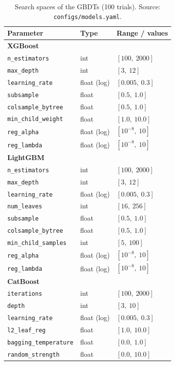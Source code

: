 \begin{table}[htbp]
\centering\footnotesize
\caption[Search spaces --- GBDTs]{Search spaces of the GBDTs (100
trials). Source: \texttt{configs/\allowbreak models.\allowbreak yaml}.}
\label{tab:app-busca-gbdt}
\begin{tabular}{lll}
\toprule
Parameter & Type & Range / values \\
\midrule
\multicolumn{3}{l}{\textbf{XGBoost}} \\
\texttt{n\_estimators}      & int   & $[100,\ 2000]$ \\
\texttt{max\_depth}         & int   & $[3,\ 12]$ \\
\texttt{learning\_rate}     & float (log) & $[0.005,\ 0.3]$ \\
\texttt{subsample}          & float & $[0.5,\ 1.0]$ \\
\texttt{colsample\_\allowbreak bytree}  & float & $[0.5,\ 1.0]$ \\
\texttt{min\_\allowbreak child\_\allowbreak weight} & float & $[1.0,\ 10.0]$ \\
\texttt{reg\_alpha}         & float (log) & $[10^{-8},\ 10]$ \\
\texttt{reg\_lambda}        & float (log) & $[10^{-8},\ 10]$ \\
\midrule
\multicolumn{3}{l}{\textbf{LightGBM}} \\
\texttt{n\_estimators}       & int   & $[100,\ 2000]$ \\
\texttt{max\_depth}          & int   & $[3,\ 12]$ \\
\texttt{learning\_rate}      & float (log) & $[0.005,\ 0.3]$ \\
\texttt{num\_leaves}         & int   & $[16,\ 256]$ \\
\texttt{subsample}           & float & $[0.5,\ 1.0]$ \\
\texttt{colsample\_\allowbreak bytree}   & float & $[0.5,\ 1.0]$ \\
\texttt{min\_\allowbreak child\_\allowbreak samples} & int   & $[5,\ 100]$ \\
\texttt{reg\_alpha}          & float (log) & $[10^{-8},\ 10]$ \\
\texttt{reg\_lambda}         & float (log) & $[10^{-8},\ 10]$ \\
\midrule
\multicolumn{3}{l}{\textbf{CatBoost}} \\
\texttt{iterations}           & int   & $[100,\ 2000]$ \\
\texttt{depth}                & int   & $[3,\ 10]$ \\
\texttt{learning\_rate}       & float (log) & $[0.005,\ 0.3]$ \\
\texttt{l2\_leaf\_reg}        & float & $[1.0,\ 10.0]$ \\
\texttt{bagging\_\allowbreak temperature} & float & $[0.0,\ 1.0]$ \\
\texttt{random\_\allowbreak strength}     & float & $[0.0,\ 10.0]$ \\
\bottomrule
\end{tabular}
\end{table}

